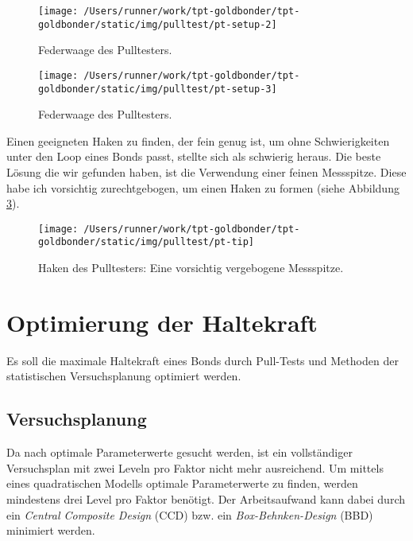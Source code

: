 \documentclass[
  paper=a4,
  ,captions=tableheading
]{scrartcl}
\begin{document}
\begin{figure}

{\centering \texttt{[image: /Users/runner/work/tpt-goldbonder/tpt-goldbonder/static/img/pulltest/pt-setup-2]} 

}

\caption{Federwaage des Pulltesters. }\label{fig:pt-setup-2}
\end{figure}

\begin{figure}

{\centering \texttt{[image: /Users/runner/work/tpt-goldbonder/tpt-goldbonder/static/img/pulltest/pt-setup-3]} 

}

\caption{Federwaage des Pulltesters. }\label{fig:pt-setup-3}
\end{figure}

Einen geeigneten Haken zu finden, der fein genug ist, um ohne Schwierigkeiten unter den Loop eines Bonds passt, stellte sich als schwierig heraus. Die beste Lösung die wir gefunden haben, ist die Verwendung einer feinen Messspitze. Diese habe ich vorsichtig zurechtgebogen, um einen Haken zu formen (siehe Abbildung \ref{fig:pulltester-tip}).

\begin{figure}

{\centering \texttt{[image: /Users/runner/work/tpt-goldbonder/tpt-goldbonder/static/img/pulltest/pt-tip]} 

}

\caption{Haken des Pulltesters: Eine vorsichtig vergebogene Messspitze.}\label{fig:pulltester-tip}
\end{figure}

\hypertarget{pt-optimal}{%
\section{Optimierung der Haltekraft}\label{pt-optimal}}

Es soll die maximale Haltekraft eines Bonds durch Pull-Tests und Methoden der statistischen Versuchsplanung optimiert werden.

\hypertarget{pt-doe}{%
\subsection{Versuchsplanung}\label{pt-doe}}

Da nach optimale Parameterwerte gesucht werden, ist ein vollständiger Versuchsplan mit zwei Leveln pro Faktor nicht mehr ausreichend. Um mittels eines quadratischen Modells optimale Parameterwerte zu finden, werden mindestens drei Level pro Faktor benötigt. Der Arbeitsaufwand kann dabei durch ein \emph{Central Composite Design} (CCD) bzw. ein \emph{Box-Behnken-Design} (BBD) minimiert werden.
\end{document}
